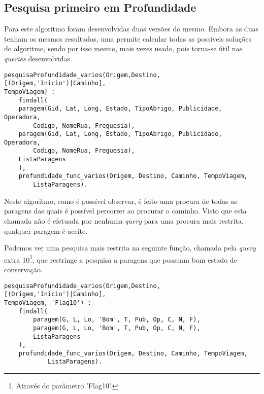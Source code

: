 \documentclass[a4paper,12pt]{report}
\begin{document}
\subsection{Pesquisa primeiro em Profundidade}

Para este algoritmo foram desenvolvidas duas versões do mesmo. Embora as duas tenham os mesmos resultados, uma permite calcular todas as possíveis soluções do algoritmo, sendo por isso mesmo, mais vezes usado, pois torna-se útil nas \textit{queries} desenvolvidas.



\begin{verbatim}
pesquisaProfundidade_varios(Origem,Destino,[(Origem,'Inicio')|Caminho],
TempoViagem) :-
    findall(
    paragem(Gid, Lat, Long, Estado, TipoAbrigo, Publicidade, Operadora,
        Codigo, NomeRua, Freguesia),
    paragem(Gid, Lat, Long, Estado, TipoAbrigo, Publicidade, Operadora, 
        Codigo, NomeRua, Freguesia),
    ListaParagens
    ),
    profundidade_func_varios(Origem, Destino, Caminho, TempoViagem,
        ListaParagens).
\end{verbatim}

\vspace{0.5cm}

\par Neste algoritmo, como é possível observar, é feito uma procura de todas as paragens das quais é possível percorrer ao procurar o caminho. Visto que esta chamada não é efetuada por nenhuma \textit{query} para uma procura mais restrita, qualquer paragem é aceite.
\par Podemos ver uma pesquisa mais restrita na seguinte função, chamada pela \textit{query} extra 10\footnote{Através do parâmetro 'Flag10'.}, que restringe a pesquisa a paragens que possuam bom estado de conservação.

\vspace{5cm}

\begin{verbatim}
pesquisaProfundidade_varios(Origem,Destino,[(Origem,'Inicio')|Caminho],
TempoViagem, 'Flag10') :-
    findall(
        paragem(G, L, Lo, 'Bom', T, Pub, Op, C, N, F),
        paragem(G, L, Lo, 'Bom', T, Pub, Op, C, N, F),
        ListaParagens
    ),
    profundidade_func_varios(Origem, Destino, Caminho, TempoViagem,
    	    ListaParagens).
\end{verbatim}

\vspace{0.5cm}
\end{document}
